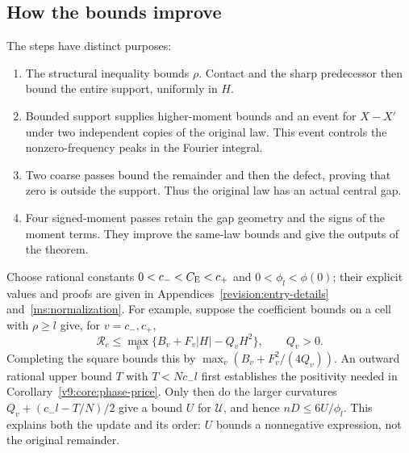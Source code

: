 \subsection{How the bounds improve}
The steps have distinct purposes:
\begin{enumerate}[leftmargin=*]
\item The structural inequality bounds $\rho$. Contact and the sharp
predecessor then bound the entire support, uniformly in $H$.
\item Bounded support supplies higher-moment bounds and an event for
$X-X'$ under two independent copies of the original law. This event
controls the nonzero-frequency peaks in the Fourier integral.
\item Two coarse passes bound the remainder and then the defect,
proving that zero is outside the support. Thus the original law has
an actual central gap.
\item Four signed-moment passes retain the gap geometry and the signs
of the moment terms. They improve the same-law bounds and give the
outputs of the theorem.
\end{enumerate}
Choose rational constants $0<c_-<C_{\mathrm E}<c_+$ and $0<\phi_l<\phi(0)$;
their explicit values and proofs are given in
Appendices~\ref{revision:entry-details} and~\ref{ms:normalization}.
For example, suppose the coefficient bounds on a cell with $\rho\ge l$
give, for $v=c_-,c_+$,
\[
 \mathcal R_c\le\max_v\{B_v+F_v|H|-Q_vH^2\},\qquad Q_v>0.
\]
Completing the square bounds this by
$\max_v(B_v+F_v^2/(4Q_v))$. An outward rational upper bound $T$ with
$T<Nc_-l$ first establishes the positivity needed in
Corollary~\ref{v9:core:phase-price}. Only then do the larger curvatures
$Q_v+(c_-l-T/N)/2$ give a bound $U$ for $\mathcal U$, and hence
$nD\le6U/\phi_l$. This explains both the update and its order:
$U$ bounds a nonnegative expression, not the original remainder.

